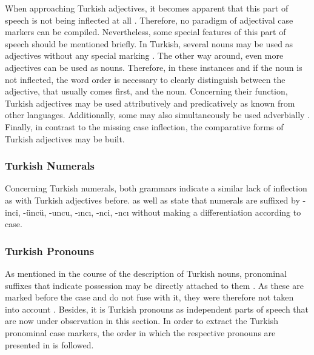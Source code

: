 \documentclass[11pt,a4paper,twoside,openright]{scrbook}
\begin{document}
When approaching Turkish adjectives, it becomes apparent that this part of speech is not being inflected at all \citep{goeksel2005tuer}. Therefore, no paradigm of adjectival case markers can be compiled. Nevertheless, some special features of this part of speech should be mentioned briefly. In Turkish, several nouns may be used as adjectives without any special marking \citep{ersenrasch2012tuer}. The other way around, even more adjectives can be used as nouns. Therefore, in these instances and if the noun is not inflected, the word order is necessary to clearly distinguish between the adjective, that usually comes first, and the noun. Concerning their function, Turkish adjectives may be used attributively and predicatively as known from other languages. Additionally, some may also simultaneously be used adverbially \citep{ersenrasch2012tuer}. Finally, in contrast to the missing case inflection, the comparative forms of Turkish adjectives may be built.


\subsubsection{Turkish Numerals}

Concerning Turkish numerals, both grammars indicate a similar lack of inflection as with Turkish adjectives before. \citet{ersenrasch2012tuer} as well as \citet{goeksel2005tuer} state that numerals are suffixed by \foreignlanguage{turkish}{-inci, -üncü,  -uncu, -ıncı, -nci, -ncı} without making a differentiation according to case.


\subsubsection{Turkish Pronouns}

As mentioned in the course of the description of Turkish nouns, pronominal suffixes that indicate possession may be directly attached to them \citep{ersenrasch2012tuer}. As these are marked before the case and do not fuse with it, they were therefore not taken into account \citep{blake1994case}. Besides, it is Turkish pronouns as independent parts of speech that are now under observation in this section. In order to extract the Turkish pronominal case markers, the order in which the respective pronouns are presented in \citet{ersenrasch2012tuer} is followed.
\end{document}
